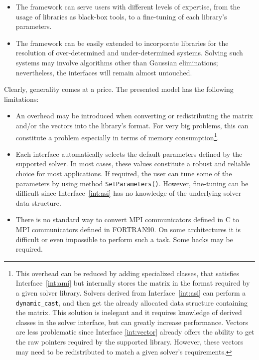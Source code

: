 \documentclass[acmtocl]{acmtrans2m}
\begin{document}
\begin{itemize}
\item
The framework can serve users with different levels of expertise, from the
usage of libraries as black-box tools, to a fine-tuning of each library's
parameters.

\item 
The framework can be easily extended to incorporate libraries for the
resolution of over-determined and under-determined systems. Solving such
systems may involve algorithms other than Gaussian eliminations; nevertheless,
the interfaces will remain almost untouched.

\end{itemize}

Clearly, generality comes at a price. The presented model has the following
limitations:
\begin{itemize}
\item
An overhead may be introduced when converting or redistributing the matrix and/or the
vectors into the library's format. For very big problems, this can constitute a
problem especially  in terms of memory consumption\footnote{
This overhead can be reduced by adding specialized classes, that satisfies
  Interface~\ref{int:ami} but internally stores the matrix in the format
  required by a given solver library. Solvers derived from
  Interface~\ref{int:asi} can perform a {\tt
    dynamic\_cast}, and then get the already allocated data structure containing
  the matrix. This solution is inelegant and it requires knowledge of derived
  classes in the solver interface, but can greatly increase performance.
  Vectors are less problematic since Interface \ref{int:vector} already
  offers the ability to get the raw pointers required by the supported library. However, these vectors may
  need to be redistributed to match a given solver's requirements.}.
\item 
Each interface automatically selects the default parameters defined by the
supported solver. In most cases, these values constitute a robust and reliable
choice for most applications. If required, the user can tune some of the
parameters by using method \verb!SetParameters()!. However, fine-tuning can be
difficult since Interface~\ref{int:asi} has no knowledge of the underlying
solver data structure.

\item There
  is no standard way to 
  convert MPI communicators defined in C to MPI communicators defined
  in FORTRAN90. On some architectures it is difficult or even
  impossible to perform such a task. Some hacks may be required.


\end{itemize}
\end{document}
